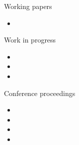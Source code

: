 \documentclass{resume}
\begin{document}
\begin{rSection}{Working papers}
\begin{itemize}
  \item {}
\end{itemize}
\end{rSection}

\begin{rSection}{Work in progress}
\begin{itemize}
  \item {}
  \item {}
  \item {}
\end{itemize}
\end{rSection}


\begin{rSection}{Conference proceedings}
\begin{itemize}
\item {}
\item {}
\item {}
\item {}
\end{itemize}

\end{rSection}
\end{document}
